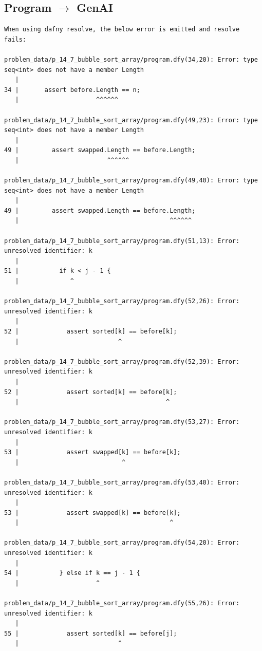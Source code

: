 \documentclass{article}
\begin{document}
\subsection*{Program $\rightarrow$ GenAI}
\begin{lstlisting}
When using dafny resolve, the below error is emitted and resolve fails:

problem_data/p_14_7_bubble_sort_array/program.dfy(34,20): Error: type seq<int> does not have a member Length
   |
34 |       assert before.Length == n;
   |                     ^^^^^^

problem_data/p_14_7_bubble_sort_array/program.dfy(49,23): Error: type seq<int> does not have a member Length
   |
49 |         assert swapped.Length == before.Length;
   |                        ^^^^^^

problem_data/p_14_7_bubble_sort_array/program.dfy(49,40): Error: type seq<int> does not have a member Length
   |
49 |         assert swapped.Length == before.Length;
   |                                         ^^^^^^

problem_data/p_14_7_bubble_sort_array/program.dfy(51,13): Error: unresolved identifier: k
   |
51 |           if k < j - 1 {
   |              ^

problem_data/p_14_7_bubble_sort_array/program.dfy(52,26): Error: unresolved identifier: k
   |
52 |             assert sorted[k] == before[k];
   |                           ^

problem_data/p_14_7_bubble_sort_array/program.dfy(52,39): Error: unresolved identifier: k
   |
52 |             assert sorted[k] == before[k];
   |                                        ^

problem_data/p_14_7_bubble_sort_array/program.dfy(53,27): Error: unresolved identifier: k
   |
53 |             assert swapped[k] == before[k];
   |                            ^

problem_data/p_14_7_bubble_sort_array/program.dfy(53,40): Error: unresolved identifier: k
   |
53 |             assert swapped[k] == before[k];
   |                                         ^

problem_data/p_14_7_bubble_sort_array/program.dfy(54,20): Error: unresolved identifier: k
   |
54 |           } else if k == j - 1 {
   |                     ^

problem_data/p_14_7_bubble_sort_array/program.dfy(55,26): Error: unresolved identifier: k
   |
55 |             assert sorted[k] == before[j];
   |                           ^


\end{lstlisting}
\end{document}
